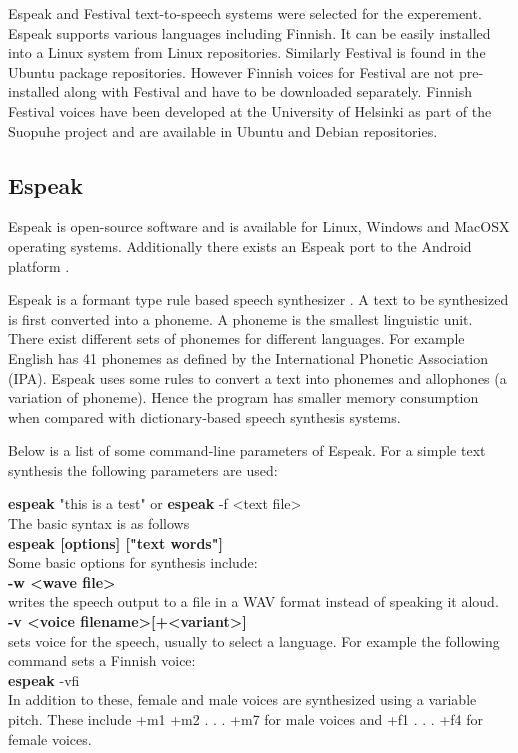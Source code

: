 \documentclass[11pt,a4paper,oneside,article]{memoir}
\begin{document}
Espeak and Festival text-to-speech systems were selected for the experement. Espeak supports various languages including Finnish. It can be easily installed into a Linux system from Linux repositories. Similarly Festival is found in the Ubuntu  package repositories. However Finnish voices for Festival are not pre-installed along with Festival and have to be downloaded separately. Finnish Festival voices have been developed at the University of Helsinki as part of the Suopuhe project and are available in Ubuntu and Debian repositories. 


\subsection{Espeak}

Espeak is open-source software and is available for Linux, Windows and MacOSX operating systems. Additionally there exists an Espeak port to the Android platform \cite{espeak}.

Espeak is a formant type rule based speech synthesizer \cite{espeak}. A text to be synthesized is first converted into a phoneme. A phoneme is the smallest linguistic unit. There exist different sets of phonemes for different languages. For example English has 41 phonemes as defined by the International Phonetic Association (IPA). Espeak uses some rules to convert a text into  phonemes and allophones (a variation of phoneme). Hence the program has smaller memory consumption when compared with dictionary-based speech synthesis systems.


Below is a list of some command-line parameters of Espeak. For a simple text synthesis the following parameters are used:

\setlength{\leftskip}{1cm}
\textbf{espeak} "this is a test" or \textbf{espeak} -f <text file>\\
The basic syntax is as follows\\
\textbf{espeak [options] ["text words"]}\\
Some basic options for synthesis include:\\
\textbf{-w <wave file>}\\
writes the speech output to a file in a WAV format instead of speaking it aloud.\\ 
\textbf{-v <voice filename>[+<variant>]}\\
sets voice for the speech, usually to select a language. For example the following command sets a Finnish voice:\\
\textbf{espeak} -vfi\\
In addition to these, female and male voices are synthesized using a variable pitch. These include +m1 +m2 . . . +m7 for male voices and +f1 . . . +f4 for female voices.
\end{document}
